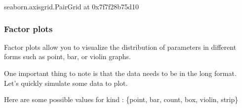 \documentclass[letterpaper,10pt,english]{sphinxmanual}
\begin{document}
\begin{sphinxVerbatim}[commandchars=\\\{\}]
\PYGZlt{}seaborn.axisgrid.PairGrid at 0x7f7f28b75d10\PYGZgt{}
\end{sphinxVerbatim}

\noindent{}


\subsubsection{Factor plots}
\label{\detokenize{content/Introduction_to_Plotting:factor-plots}}
Factor plots allow you to visualize the distribution of parameters in different forms such as point, bar, or violin graphs.

One important thing to note is that the data needs to be in the long format. Let’s quickly simulate some data to plot.

Here are some possible values for kind : \{point, bar, count, box, violin, strip\}
\end{document}

